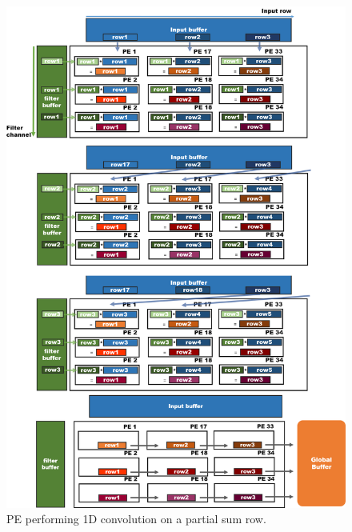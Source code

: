 \begin{figure}[h!]
    \centering
    \includegraphics[width=1\linewidth]{inc/4_proposed_architecture/figure/pe_dataflow.png}
    \caption{PE performing 1D convolution on a partial sum row.}
    \label{fig:pe_dataflow}
\end{figure}
